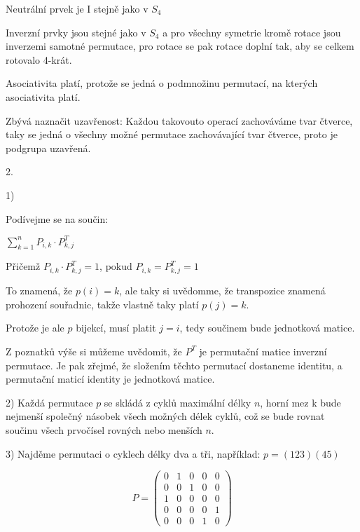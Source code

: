 \documentclass[10pt,a4paper]{article}
\begin{document}
Neutrální prvek je I stejně jako v $S_4$

Inverzní prvky jsou stejné jako v $S_4$ a pro všechny symetrie kromě rotace jsou inverzemi samotné permutace, pro rotace se pak rotace doplní tak, aby se celkem rotovalo 4-krát.

Asociativita platí, protože se jedná o podmnožinu permutací, na kterých asociativita platí.

Zbývá naznačit uzavřenost: Každou takovouto operací zachováváme tvar čtverce, taky se jedná o všechny možné permutace zachovávající tvar čtverce, proto je podgrupa uzavřená.

\hfill

2.

1)

\hfill

Podívejme se na součin:

$\sum_{k=1}^n P_{i,k} \cdot P^T_{k,j}$

Přičemž $P_{i,k} \cdot P^T_{k,j} = 1$, pokud $P_{i,k} = P^T_{k,j} = 1$

To znamená, že $p(i) = k$, ale taky si uvědomme, že transpozice znamená prohození souřadnic, takže vlastně taky platí $p(j) = k$.

Protože je ale $p$ bijekcí, musí platit $j = i$, tedy součinem bude jednotková matice.

\hfill

Z poznatků výše si můžeme uvědomit, že $P^T$ je permutační matice inverzní permutace. Je pak zřejmé, že složením těchto permutací dostaneme identitu, a permutační maticí identity je jednotková matice.


\hfill

2) Každá permutace $p$ se skládá z cyklů maximální délky $n$, horní mez k bude nejmenší společný násobek všech možných délek cyklů, což se bude rovnat součinu všech prvočísel rovných nebo menších $n$.


\hfill

3) 
Najděme permutaci o cyklech délky dva a tři, například:
$p = (1 2 3)(4 5)$

\begin{equation*}
P =
\begin{pmatrix}
0 & 1 & 0 & 0 & 0 \\
0 & 0 & 1 & 0 & 0 \\
1 & 0 & 0 & 0 & 0 \\
0 & 0 & 0 & 0 & 1 \\
0 & 0 & 0 & 1 & 0
\end{pmatrix}
\end{equation*}
\end{document}
